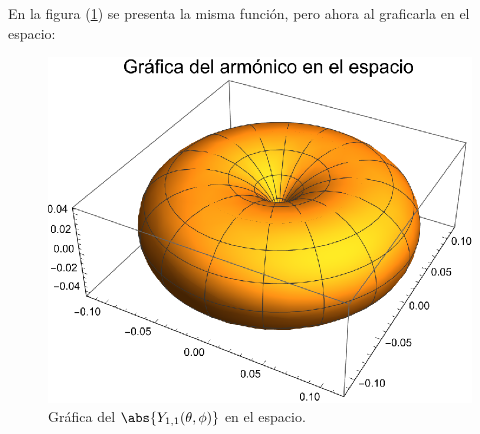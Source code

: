 En la figura (\ref{fig:figura_plot_Y11_02}) se presenta la misma función, pero ahora al graficarla en el espacio:
\begin{figure}[H]
    \centering
    \includegraphics[scale=1]{Imagenes/Plot_Y11_02.eps}
    \caption{Gráfica del $\abs{Y_{1, 1} (\theta, \phi)}$ en el espacio.}
    \label{fig:figura_plot_Y11_02}
\end{figure}

